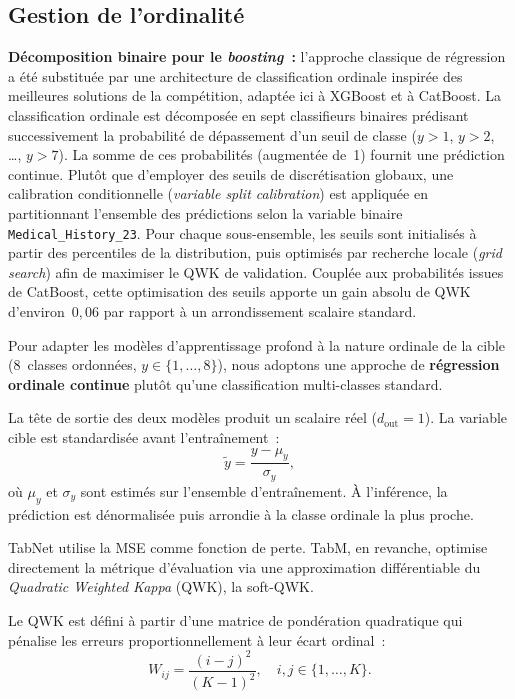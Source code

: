 \documentclass[conference]{IEEEtran}
\begin{document}
\subsection{Gestion de l'ordinalité}

\textbf{Décomposition binaire pour le \textit{boosting}~:} l'approche classique de régression a été substituée par une architecture de classification ordinale inspirée des meilleures solutions de la compétition, adaptée ici à XGBoost et à CatBoost. La classification ordinale est décomposée en sept classifieurs binaires prédisant successivement la probabilité de dépassement d'un seuil de classe ($y > 1$, $y > 2$, \ldots, $y > 7$). La somme de ces probabilités (augmentée de~1) fournit une prédiction continue. Plutôt que d'employer des seuils de discrétisation globaux, une calibration conditionnelle (\textit{variable split calibration}) est appliquée en partitionnant l'ensemble des prédictions selon la variable binaire \texttt{Medical\_History\_23}. Pour chaque sous-ensemble, les seuils sont initialisés à partir des percentiles de la distribution, puis optimisés par recherche locale (\textit{grid search}) afin de maximiser le QWK de validation. Couplée aux probabilités issues de CatBoost, cette optimisation des seuils apporte un gain absolu de QWK d'environ~$0{,}06$ par rapport à un arrondissement scalaire standard.

Pour adapter les modèles d'apprentissage profond à la nature ordinale de la cible ($8$~classes ordonnées, $y \in \{1, \ldots, 8\}$), nous adoptons une approche de \textbf{régression ordinale continue} plutôt qu'une classification multi-classes standard.

La tête de sortie des deux modèles produit un scalaire réel ($d_{\text{out}}=1$). La variable cible est standardisée avant l'entraînement~:
\begin{equation}
  \tilde{y} = \frac{y - \mu_y}{\sigma_y},
\end{equation}
où $\mu_y$ et $\sigma_y$ sont estimés sur l'ensemble d'entraînement. À l'inférence, la prédiction est dénormalisée puis arrondie à la classe ordinale la plus proche.

TabNet utilise la MSE comme fonction de perte. TabM, en revanche, optimise directement la métrique d'évaluation via une approximation différentiable du \textit{Quadratic Weighted Kappa} (QWK), la soft-QWK.

Le QWK est défini à partir d'une matrice de pondération quadratique qui pénalise les erreurs proportionnellement à leur écart ordinal~:
\begin{equation}
  W_{ij} = \frac{(i - j)^2}{(K-1)^2}, \quad i, j \in \{1, \ldots, K\}.
\end{equation}
\end{document}
